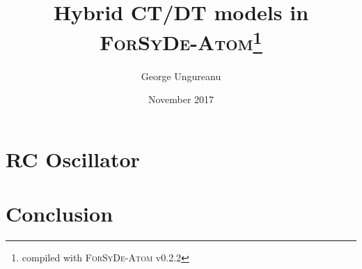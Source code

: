 \documentclass{article}
\title{Hybrid CT/DT models in\\\textsc{ForSyDe-Atom}\thanks{compiled with \textsc{ForSyDe-Atom} v0.2.2}}
\author{George Ungureanu}
\date{November 2017}
\begin{document}
\maketitle

\begin{abstract}

\end{abstract}



\newpage
\tableofcontents
\newpage



\section{RC Oscillator}
\label{sec:rc-oscillator}


\section{Conclusion}
\label{sec:conclusion}


\printbibliography
\end{document}
